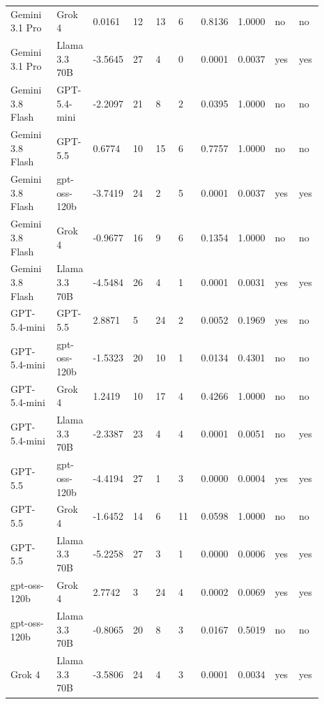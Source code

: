 \begin{landscape}
\begin{longtable}{p{0.162\linewidth}p{0.081\linewidth}p{0.081\linewidth}p{0.081\linewidth}p{0.081\linewidth}p{0.081\linewidth}p{0.081\linewidth}p{0.081\linewidth}p{0.081\linewidth}p{0.081\linewidth}}
Gemini 3.1 Pro & Grok 4 & 0.0161 & 12 & 13 & 6 & 0.8136 & 1.0000 & no & no \\
Gemini 3.1 Pro & Llama 3.3 70B & -3.5645 & 27 & 4 & 0 & 0.0001 & 0.0037 & yes & yes \\
Gemini 3.8 Flash & GPT-5.4-mini & -2.2097 & 21 & 8 & 2 & 0.0395 & 1.0000 & no & no \\
Gemini 3.8 Flash & GPT-5.5 & 0.6774 & 10 & 15 & 6 & 0.7757 & 1.0000 & no & no \\
Gemini 3.8 Flash & gpt-oss-120b & -3.7419 & 24 & 2 & 5 & 0.0001 & 0.0037 & yes & yes \\
Gemini 3.8 Flash & Grok 4 & -0.9677 & 16 & 9 & 6 & 0.1354 & 1.0000 & no & no \\
Gemini 3.8 Flash & Llama 3.3 70B & -4.5484 & 26 & 4 & 1 & 0.0001 & 0.0031 & yes & yes \\
GPT-5.4-mini & GPT-5.5 & 2.8871 & 5 & 24 & 2 & 0.0052 & 0.1969 & yes & no \\
GPT-5.4-mini & gpt-oss-120b & -1.5323 & 20 & 10 & 1 & 0.0134 & 0.4301 & no & no \\
GPT-5.4-mini & Grok 4 & 1.2419 & 10 & 17 & 4 & 0.4266 & 1.0000 & no & no \\
GPT-5.4-mini & Llama 3.3 70B & -2.3387 & 23 & 4 & 4 & 0.0001 & 0.0051 & no & yes \\
GPT-5.5 & gpt-oss-120b & -4.4194 & 27 & 1 & 3 & 0.0000 & 0.0004 & yes & yes \\
GPT-5.5 & Grok 4 & -1.6452 & 14 & 6 & 11 & 0.0598 & 1.0000 & no & no \\
GPT-5.5 & Llama 3.3 70B & -5.2258 & 27 & 3 & 1 & 0.0000 & 0.0006 & yes & yes \\
gpt-oss-120b & Grok 4 & 2.7742 & 3 & 24 & 4 & 0.0002 & 0.0069 & yes & yes \\
gpt-oss-120b & Llama 3.3 70B & -0.8065 & 20 & 8 & 3 & 0.0167 & 0.5019 & no & no \\
Grok 4 & Llama 3.3 70B & -3.5806 & 24 & 4 & 3 & 0.0001 & 0.0034 & yes & yes \\
\bottomrule
\end{longtable}
\normalsize
\end{landscape}
